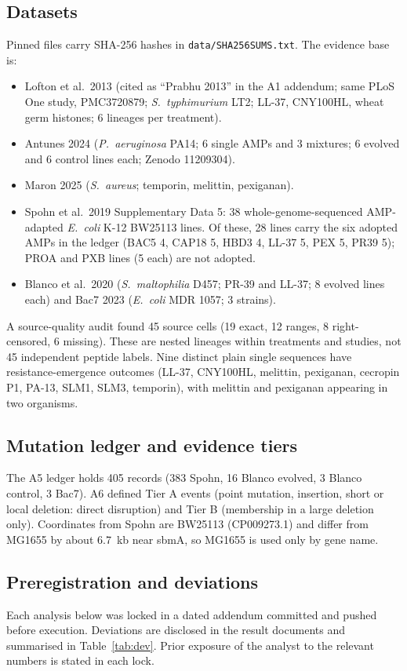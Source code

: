\documentclass[11pt,letterpaper]{article}
\begin{document}
\subsection{Datasets}
Pinned files carry SHA-256 hashes in \texttt{data/SHA256SUMS.txt}. The evidence base is:
\begin{itemize}\setlength\itemsep{1pt}
\item Lofton et al.\ 2013 (cited as ``Prabhu 2013'' in the A1 addendum; same PLoS One study, PMC3720879; \textit{S.\ typhimurium} LT2; LL-37, CNY100HL, wheat germ histones; 6 lineages per treatment).
\item Antunes 2024 (\textit{P.\ aeruginosa} PA14; 6 single AMPs and 3 mixtures; 6 evolved and 6 control lines each; Zenodo 11209304).
\item Maron 2025 (\textit{S.\ aureus}; temporin, melittin, pexiganan).
\item Spohn et al.\ 2019 Supplementary Data 5: 38 whole-genome-sequenced AMP-adapted \textit{E.\ coli} K-12 BW25113 lines. Of these, 28 lines carry the six adopted AMPs in the ledger (BAC5 4, CAP18 5, HBD3 4, LL-37 5, PEX 5, PR39 5); PROA and PXB lines (5 each) are not adopted.
\item Blanco et al.\ 2020 (\textit{S.\ maltophilia} D457; PR-39 and LL-37; 8 evolved lines each) and Bac7 2023 (\textit{E.\ coli} MDR 1057; 3 strains).
\end{itemize}
A source-quality audit found 45 source cells (19 exact, 12 ranges, 8 right-censored, 6 missing). These are nested lineages within treatments and studies, not 45 independent peptide labels. Nine distinct plain single sequences have resistance-emergence outcomes (LL-37, CNY100HL, melittin, pexiganan, cecropin P1, PA-13, SLM1, SLM3, temporin), with melittin and pexiganan appearing in two organisms.

\subsection{Mutation ledger and evidence tiers}
The A5 ledger holds 405 records (383 Spohn, 16 Blanco evolved, 3 Blanco control, 3 Bac7). A6 defined Tier A events (point mutation, insertion, short or local deletion: direct disruption) and Tier B (membership in a large deletion only). Coordinates from Spohn are BW25113 (CP009273.1) and differ from MG1655 by about 6.7~kb near sbmA, so MG1655 is used only by gene name.

\subsection{Preregistration and deviations}
Each analysis below was locked in a dated addendum committed and pushed before execution. Deviations are disclosed in the result documents and summarised in Table~\ref{tab:dev}. Prior exposure of the analyst to the relevant numbers is stated in each lock.
\end{document}
